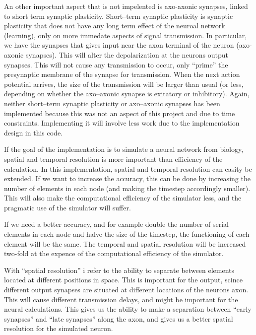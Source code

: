 An other important aspect that is not impelented is axo-axonic synapses, linked to short term synaptic plasticity.
Short--term synaptic plasticity is synaptic plasticity that does not have any long term effect of the neuroal network (learning), only on more immedate aspects of signal transmission.
In particular, we have the synapses that gives input near the axon terminal of the neuron (axo-axonic synapses). This will alter the depolarization at the neurons output synapses. %
This will not cause any transmission to occur, only ``prime'' the presynaptic membrane of the synapse for transmission.
When the next action potential arrives, the size of the transmission will be larger than usual (or less, depending on whether the axo--axonic synapse is exitatory or inhibitory).
Again, neither short--term synaptic plasticity or axo--axonic synapses has been implemented because this was not an aspect of this project and due to time constraints.
Implementing it will involve less work due to the implementation design in this code.

If the goal of the implementation is to simulate a neural network from biology, spatial and temporal resolution is more important than efficiency of the calculation.
In this implementation, spatial and temporal resolution can easity be extended.
If we want to increase the accuracy, this can be done by increasing the number of elements in each node (and making the timestep accordingly smaller).
This will also make the computational efficiency of the simulator less, and the pragmatic use of the simulator will suffer.

If we need a better accuracy, and for example double the number of serial elements in each node and halve the size of the timestep, the functioning of each element will be the same.
The temporal and spatial resolution will be increased two-fold at the expence of the computational efficiency of the simulator.

With ``spatial resolution'' i refer to the ability to separate between elements located at different positions in space.
This is important for the output, scince different output synapses are situated at different locations of the neurons axon.
This will cause different transmission delays, and might be important for the neural calculations.
This gives us the ability to make a separation between ``early synapses'' and ``late synapses'' along the axon, and gives us a better spatial resolution for the simulated neuron.

